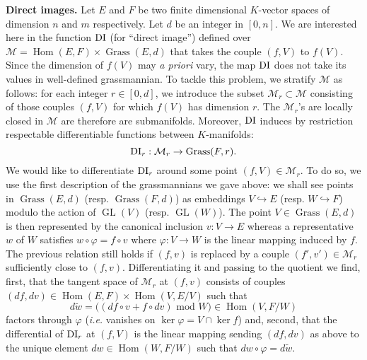 \documentclass{sig-alternate}
\DeclareMathOperator{\Hom}{Hom}
\DeclareMathOperator{\GL}{GL}
\DeclareMathOperator{\Grass}{Grass}
\begin{document}
\noindent
{\bf Direct images.}
Let $E$ and $F$ be two finite dimensional $K$-vector spaces of dimension 
$n$ and $m$ respectively. Let $d$ be an integer in $[0,n]$. We are
interested here in the function $\text{\rm DI}$ (for ``direct image'') defined 
over $\mathcal M = \Hom(E,F) \times \Grass(E,d)$ that takes the 
couple $(f,V)$ to $f(V)$. Since the dimension of $f(V)$ may \emph{a 
priori} vary, the map $\text{\rm DI}$ does not take its values in well-defined 
grassmannian. To tackle this problem, we stratify $\mathcal M$ as
follows: for each integer $r \in [0,d]$, we introduce the subset
$\mathcal M_r \subset \mathcal M$ consisting of those couples $(f,V)$
for which $f(V)$ has dimension $r$. The $\mathcal M_r$'s are
locally closed in $\mathcal M$ are therefore are submanifolds. 
Moreover, $\text{\rm DI}$ induces by restriction respectable differentiable 
functions between $K$-manifolds:
$$\DI_r : \mathcal M_r \to \Grass(F,r).$$
We would like to differentiate $\text{\rm DI}_r$ around some point $(f,V) \in 
\mathcal M_r$. To do so, we use the first description of the 
grassmannians we gave above: we shall see points in $\Grass(E,d)$ 
(resp. $\Grass(F,d)$) as embeddings $V \hookrightarrow E$ (resp. $W 
\hookrightarrow F$) modulo the action of $\GL(V)$ (resp. $\GL(W)$).
The point $V \in \Grass(E,d)$ is then represented by the canonical 
inclusion $v : V \to E$ whereas a representative $w$ of $W$ satisfies
$w \circ \varphi = f \circ v$
where $\varphi : V \to W$ is the linear mapping induced by $f$. The 
previous relation still holds if $(f,v)$ is replaced by a couple $(f', 
v') \in \mathcal M_r$ sufficiently close to $(f,v)$.
Differentiating it and passing to the quotient we find, first, that the 
tangent space of $\mathcal M_r$ at $(f,v)$ consists of couples $(df, dv) 
\in \Hom(E,F) \times \Hom(V,E/V)$ such that
$$d\tilde w = \big((df \circ v + f \circ dv) \text{ mod } W\big)
\in \Hom(V, F/W)$$
factors through $\varphi$ (\emph{i.e.} vanishes on $\ker \varphi = V 
\cap \ker f$) and, second, that the differential of $\text{\rm DI}_r$ at $(f,V)$ 
is the linear mapping sending $(df,dv)$ as above to the unique element 
$dw \in \Hom(W,F/W)$ such that $dw \circ \varphi = d \tilde w$.

\medskip
\end{document}

